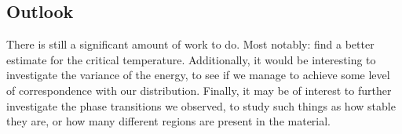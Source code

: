 \documentclass[a4paper, 10pt]{article}
\begin{document}
\subsection{Outlook}
There is still a significant amount of work to do. Most notably: find a better estimate for the critical temperature. Additionally, it would be interesting to investigate the variance of the energy, to see if we manage to achieve some level of correspondence with our distribution. Finally, it may be of interest to further investigate the phase transitions we observed, to study such things as how stable they are, or how many different regions are present in the material.


\newpage
\end{document}
